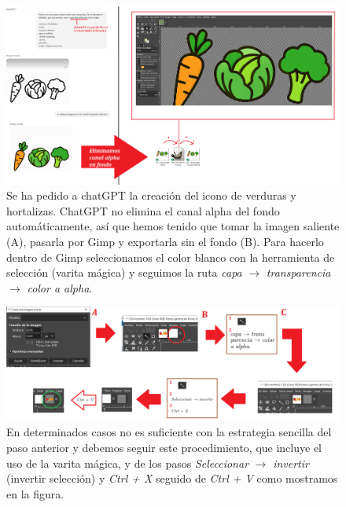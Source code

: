 \documentclass[a4paper,12pt]{report}
\begin{document}
\FloatBarrier
\setlength{\belowcaptionskip}{3pt}
\begin{figure}[H]
	\centering
	\caption{Se ha pedido a chatGPT la creación del icono de verduras y hortalizas. ChatGPT no elimina el canal alpha del fondo automáticamente, así que hemos tenido que tomar la imagen saliente (A), pasarla por Gimp y exportarla sin el fondo (B). Para hacerlo dentro de Gimp seleccionamos el color blanco con la herramienta de selección (varita mágica) y seguimos la ruta \textit{capa} $\rightarrow$ \textit{transparencia} $\rightarrow$ \textit{color a alpha}.}
	\includegraphics[width=1\linewidth]{img/eliminoCanalAlpha}


	\label{fig:eliminocanalalpha}
\end{figure}
\FloatBarrier


\FloatBarrier
\setlength{\belowcaptionskip}{3pt}
\begin{figure}[H]
	\centering
	\caption{En determinados casos no es suficiente con la estrategia sencilla del paso anterior y debemos seguir este procedimiento, que incluye el uso de la varita mágica, y de los pasos \textit{Seleccionar} $\rightarrow$ \textit{invertir} (invertir selección) y \textit{Ctrl + X} seguido de \textit{Ctrl + V} como mostramos en la figura.} 
	\includegraphics[width=1\linewidth]{img/eliminoCanalAlphaCOMPLEX.png}

	
	\label{fig:eliminocanalalphaCOMPLEX}
\end{figure}
\FloatBarrier
\end{document}
